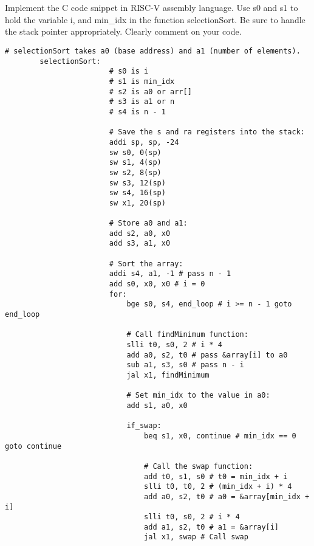 \documentclass[12pt]{article}
\begin{document}
    \section{}
    \begin{flushleft}
        Implement the C code snippet in RISC-V assembly language. Use s0 and s1 to hold the variable i, and min\_idx in the function selectionSort. 
        Be sure to handle the stack pointer appropriately. Clearly comment on your code.
    \end{flushleft}
    \begin{lstlisting}[language=RISCV]
# selectionSort takes a0 (base address) and a1 (number of elements).
        selectionSort:
                        # s0 is i
                        # s1 is min_idx
                        # s2 is a0 or arr[]
                        # s3 is a1 or n
                        # s4 is n - 1

                        # Save the s and ra registers into the stack:
                        addi sp, sp, -24
                        sw s0, 0(sp) 
                        sw s1, 4(sp)
                        sw s2, 8(sp)
                        sw s3, 12(sp)
                        sw s4, 16(sp)
                        sw x1, 20(sp)

                        # Store a0 and a1:
                        add s2, a0, x0
                        add s3, a1, x0
            
                        # Sort the array:
                        addi s4, a1, -1 # pass n - 1 
                        add s0, x0, x0 # i = 0
                        for:
                            bge s0, s4, end_loop # i >= n - 1 goto end_loop

                            # Call findMinimum function:
                            slli t0, s0, 2 # i * 4  
                            add a0, s2, t0 # pass &array[i] to a0
                            sub a1, s3, s0 # pass n - i 
                            jal x1, findMinimum

                            # Set min_idx to the value in a0:
                            add s1, a0, x0 

                            if_swap:
                                beq s1, x0, continue # min_idx == 0 goto continue

                                # Call the swap function:
                                add t0, s1, s0 # t0 = min_idx + i
                                slli t0, t0, 2 # (min_idx + i) * 4 
                                add a0, s2, t0 # a0 = &array[min_idx + i]
                                slli t0, s0, 2 # i * 4
                                add a1, s2, t0 # a1 = &array[i]
                                jal x1, swap # Call swap


\end{lstlisting}
\end{document}
